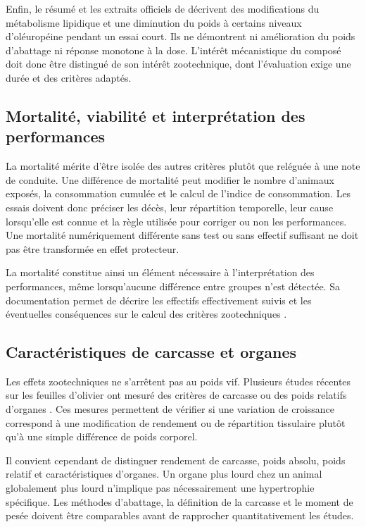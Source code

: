 Enfin, le résumé et les extraits officiels de \citet{Sulaiman2025} décrivent des modifications du métabolisme lipidique et une diminution du poids à certains niveaux d'oléuropéine pendant un essai court. Ils ne démontrent ni amélioration du poids d'abattage ni réponse monotone à la dose. L'intérêt mécanistique du composé doit donc être distingué de son intérêt zootechnique, dont l'évaluation exige une durée et des critères adaptés.

\subsection{Mortalité, viabilité et interprétation des performances}

La mortalité mérite d'être isolée des autres critères plutôt que reléguée à une note de conduite. Une différence de mortalité peut modifier le nombre d'animaux exposés, la consommation cumulée et le calcul de l'indice de consommation. Les essais doivent donc préciser les décès, leur répartition temporelle, leur cause lorsqu'elle est connue et la règle utilisée pour corriger ou non les performances. Une mortalité numériquement différente sans test ou sans effectif suffisant ne doit pas être transformée en effet protecteur.

La mortalité constitue ainsi un élément nécessaire à l'interprétation des performances, même lorsqu'aucune différence entre groupes n'est détectée. Sa documentation permet de décrire les effectifs effectivement suivis et les éventuelles conséquences sur le calcul des critères zootechniques \citep{PercieduSert2020}.

\subsection{Caractéristiques de carcasse et organes}

Les effets zootechniques ne s'arrêtent pas au poids vif. Plusieurs études récentes sur les feuilles d'olivier ont mesuré des critères de carcasse ou des poids relatifs d'organes \citep{Almuhayawi2023,Negm2025,Vasilopoulou2026}. Ces mesures permettent de vérifier si une variation de croissance correspond à une modification de rendement ou de répartition tissulaire plutôt qu'à une simple différence de poids corporel.

Il convient cependant de distinguer rendement de carcasse, poids absolu, poids relatif et caractéristiques d'organes. Un organe plus lourd chez un animal globalement plus lourd n'implique pas nécessairement une hypertrophie spécifique. Les méthodes d'abattage, la définition de la carcasse et le moment de pesée doivent être comparables avant de rapprocher quantitativement les études.

